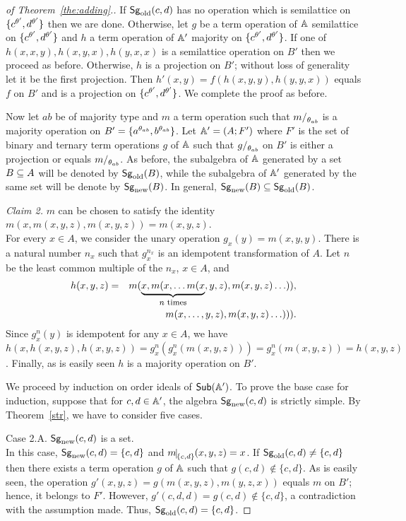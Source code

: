 \documentclass[11pt]{article}
\begin{document}
\begin{proof}[of Theorem~\ref{the:adding}.]
If ${\sf Sg}_{\mathrm{old}}(c,d)$ has no operation which is semilattice on
$\{c^{\theta'},d^{\theta'}\}$ then we are 
done. Otherwise, let $g$ be a term operation of ${\mathbb A}$ semilattice on
$\{c^{\theta'},d^{\theta'}\}$ and $h$ a term operation of ${\mathbb A}'$
majority on 
$\{c^{\theta'},d^{\theta'}\}$. If one of $h(x,x,y),h(x,y,x),h(y,x,x)$
is a semilattice operation on $B'$ then we
proceed as before. Otherwise, $h$ is a projection on
$B'$; without loss of
generality let it be the first projection. Then
$h'(x,y)=f(h(x,y,y),h(y,y,x))$ equals $f$ on
$B'$ and is a projection on
$\{c^{\theta'},d^{\theta'}\}$. We complete the proof as before.
\medskip

Now let $ab$ be of majority type and $m$ a term operation
such that $m\fac{\th_{ab}}$ is a majority operation on
$B'=\{a^{\theta_{ab}},b^{\theta_{ab}}\}$. Let
${\mathbb A}'=(A;F')$ where $F'$ is the set of binary and ternary term
operations $g$ of ${\mathbb A}$ such that $g\fac{\th_{ab}}$ on $B'$ is either a
projection or equals $m\fac{\th_{ab}}$. As before, the subalgebra of
${\mathbb A}$ generated by a set 
$B\subseteq A$ will be denoted by ${\sf Sg}_{\mathrm{old}}(B)$, while the subalgebra of
${\mathbb A}'$ generated by the same set will be denote by ${\sf Sg}_{\mathrm{new}}(B)$. In
general, ${\sf Sg}_{\mathrm{new}}(B)\subseteq{\sf Sg}_{\mathrm{old}}(B)$.
\medskip

\noindent
{\em Claim 2.} $m$ can be chosen to satisfy the identity
$m(x,m(x,y,z),m(x,y,z))=m(x,y,z)$.\\[2mm]
For every $x\in A$, we consider the unary operation $g_x(y)=m(x,y,y)$. There is 
a natural number $n_x$ such that $g_x^{n_x}$ is an idempotent transformation
of $A$. Let $n$ be the least common multiple of the $n_x$, $x\in A$, and 
\begin{eqnarray*}
h(x,y,z)&=&m(\underbrace{x,m(x,\ldots m(x}_{\mbox{\footnotesize $n$
times}},y,z),m(x,y,z)\ldots)),\\
& & m(x,\ldots,y,z),m(x,y,z)\ldots))).
\end{eqnarray*}
Since $g^n_x(y)$ is idempotent for any $x\in A$, we have
$h(x,h(x,y,z),h(x,y,z))=g^n_x(g^n_x(m(x,y,z)))=g^n_x(m(x,y,z))=h(x,y,z)$.
Finally, as is easily seen $h$ is a majority operation on
$B'$.
\medskip

We proceed by induction on order ideals of ${\sf Sub}({\mathbb A}')$. To prove the
base case for induction, suppose that for $c,d\in{\mathbb A}'$, the algebra
${\sf Sg}_{\mathrm{new}}(c,d)$ is strictly simple. By Theorem~\ref{str}, we have to
consider five cases.
\medskip

\noindent
{\sc Case 2.A.} ${\sf Sg}_{\mathrm{new}}(c,d)$ is a set.\\[2mm]
In this case, ${\sf Sg}_{\mathrm{new}}(c,d)=\{c,d\}$ and $m\red{\{c,d\}}(x,y,z)=x$. If 
${\sf Sg}_{\mathrm{old}}(c,d)\ne\{c,d\}$ then there exists a term operation $g$ of
${\mathbb A}$ such that $g(c,d)\not\in\{c,d\}$. As is easily seen, the
operation $g'(x,y,z)=g(m(x,y,z),m(y,z,x))$ equals $m$ on
$B'$; hence, it belongs to
$F'$. However, $g'(c,d,d)=g(c,d)\not\in\{c,d\}$, a contradiction with
the assumption made. Thus, ${\sf Sg}_{\mathrm{old}}(c,d)=\{c,d\}$. 


\end{proof}
\end{document}

